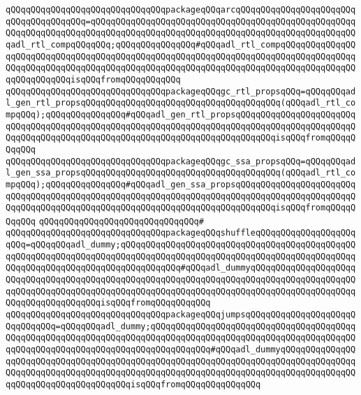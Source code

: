 \verb|qQQqqQQqqQQqqQQqqQQqqQQqqQQqqQQqpackageqQQqarcqQQqqQQqqQQqqQQqqQQqqQQqqQQqqQQqqQQqqQQq=qQQqqQQqqQQqqQQqqQQqqQQqqQQqqQQqqQQqqQQqqQQqqQQqqQQqqQQqqQQqqQQqqQQqqQQqqQQqqQQqqQQqqQQqqQQqqQQqqQQqqQQqqQQqqQQqqQQqqQQqqQQqadl_rtl_compqQQqqQQq;qQQqqQQqqQQqqQQq#qQQqadl_rtl_compqQQqqQQqqQQqqQQqqQQqqQQqqQQqqQQqqQQqqQQqqQQqqQQqqQQqqQQqqQQqqQQqqQQqqQQqqQQqqQQqqQQqqQQqqQQqqQQqqQQqqQQqqQQqqQQqqQQqqQQqqQQqqQQqqQQqqQQqqQQqqQQqqQQqqQQqqQQqqQQqqQQqqQQqisqQQqfromqQQqqQQqqQQq|\newline
\verb|qQQqqQQqqQQqqQQqqQQqqQQqqQQqqQQqpackageqQQqgc_rtl_propsqQQq=qQQqqQQqadl_gen_rtl_propsqQQqqQQqqQQqqQQqqQQqqQQqqQQqqQQqqQQqqQQq(qQQqadl_rtl_compqQQq);qQQqqQQqqQQqqQQq#qQQqadl_gen_rtl_propsqQQqqQQqqQQqqQQqqQQqqQQqqQQqqQQqqQQqqQQqqQQqqQQqqQQqqQQqqQQqqQQqqQQqqQQqqQQqqQQqqQQqqQQqqQQqqQQqqQQqqQQqqQQqqQQqqQQqqQQqqQQqqQQqqQQqqQQqqQQqqQQqqQQqisqQQqfromqQQqqQQqqQQq|\newline
\verb|qQQqqQQqqQQqqQQqqQQqqQQqqQQqqQQqpackageqQQqgc_ssa_propsqQQq=qQQqqQQqadl_gen_ssa_propsqQQqqQQqqQQqqQQqqQQqqQQqqQQqqQQqqQQqqQQq(qQQqadl_rtl_compqQQq);qQQqqQQqqQQqqQQq#qQQqadl_gen_ssa_propsqQQqqQQqqQQqqQQqqQQqqQQqqQQqqQQqqQQqqQQqqQQqqQQqqQQqqQQqqQQqqQQqqQQqqQQqqQQqqQQqqQQqqQQqqQQqqQQqqQQqqQQqqQQqqQQqqQQqqQQqqQQqqQQqqQQqqQQqqQQqqQQqqQQqisqQQqfromqQQqqQQqqQQq|\newline
\verb|qQQqqQQqqQQqqQQqqQQqqQQqqQQqqQQq#|\newline
\verb|qQQqqQQqqQQqqQQqqQQqqQQqqQQqqQQqpackageqQQqshuffleqQQqqQQqqQQqqQQqqQQqqQQq=qQQqqQQqadl_dummy;qQQqqQQqqQQqqQQqqQQqqQQqqQQqqQQqqQQqqQQqqQQqqQQqqQQqqQQqqQQqqQQqqQQqqQQqqQQqqQQqqQQqqQQqqQQqqQQqqQQqqQQqqQQqqQQqqQQqqQQqqQQqqQQqqQQqqQQqqQQqqQQqqQQqqQQq#qQQqadl_dummyqQQqqQQqqQQqqQQqqQQqqQQqqQQqqQQqqQQqqQQqqQQqqQQqqQQqqQQqqQQqqQQqqQQqqQQqqQQqqQQqqQQqqQQqqQQqqQQqqQQqqQQqqQQqqQQqqQQqqQQqqQQqqQQqqQQqqQQqqQQqqQQqqQQqqQQqqQQqqQQqqQQqqQQqqQQqqQQqqQQqisqQQqfromqQQqqQQqqQQq|\newline
\verb|qQQqqQQqqQQqqQQqqQQqqQQqqQQqqQQqpackageqQQqjumpsqQQqqQQqqQQqqQQqqQQqqQQqqQQqqQQq=qQQqqQQqadl_dummy;qQQqqQQqqQQqqQQqqQQqqQQqqQQqqQQqqQQqqQQqqQQqqQQqqQQqqQQqqQQqqQQqqQQqqQQqqQQqqQQqqQQqqQQqqQQqqQQqqQQqqQQqqQQqqQQqqQQqqQQqqQQqqQQqqQQqqQQqqQQqqQQqqQQqqQQq#qQQqadl_dummyqQQqqQQqqQQqqQQqqQQqqQQqqQQqqQQqqQQqqQQqqQQqqQQqqQQqqQQqqQQqqQQqqQQqqQQqqQQqqQQqqQQqqQQqqQQqqQQqqQQqqQQqqQQqqQQqqQQqqQQqqQQqqQQqqQQqqQQqqQQqqQQqqQQqqQQqqQQqqQQqqQQqqQQqqQQqqQQqqQQqisqQQqfromqQQqqQQqqQQq|\verb|qQQq|\newline
